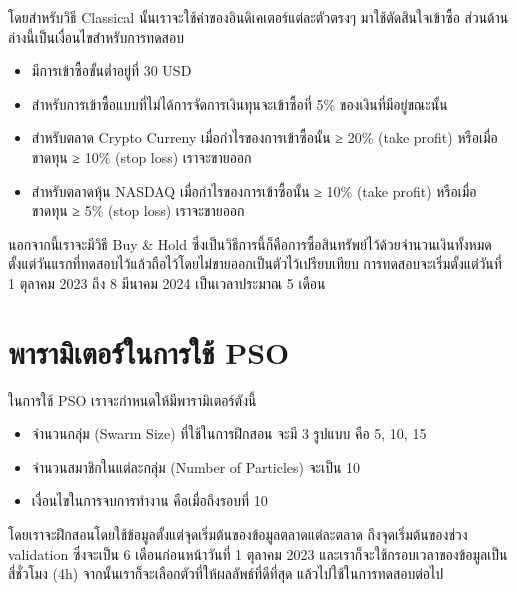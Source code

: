 โดยสำหรับวิธี Classical นั้นเราจะใช้ค่าของอินดิเคเตอร์แต่ละตัวตรงๆ มาใช้ตัดสินใจเข้าซื้อ ส่วนด้านล่างนี้เป็นเงื่อนไขสำหรับการทดสอบ

\begin{itemize}
    \item {มีการเข้าซื้อขั้นต่ำอยู่ที่ 30 USD}
    \item {สำหรับการเข้าซื้อแบบที่ไม่ได้การจัดการเงินทุนจะเข้าซื้อที่ 5\% ของเงินที่มีอยู่ขณะนั้น}
    \item {สำหรับตลาด Crypto Curreny เมื่อกำไรของการเข้าซื้อนั้น ≥ 20\% (take profit) หรือเมื่อขาดทุน ≥ 10\% (stop loss) เราจะขายออก}
    \item {สำหรับตลาดหุ้น NASDAQ เมื่อกำไรของการเข้าซื้อนั้น ≥ 10\% (take profit) หรือเมื่อขาดทุน ≥ 5\% (stop loss) เราจะขายออก}
\end{itemize}
นอกจากนี้เราจะมีวิธี Buy \& Hold ซึ่งเป็นวิธีการนี้ก็คือการซื้อสินทรัพย์ไว้ด้วยจำนวนเงินทั้งหมด ตั้งแต่วันแรกที่ทดสอบไว้แล้วถือไว้โดยไม่ขายออกเป็นตัวไว้เปรียบเทียบ การทดสอบจะเริ่มตั้งแต่วันที่ 1 ตุลาคม 2023 ถึง 8 มีนาคม 2024 เป็นเวลาประมาณ 5 เดือน

\section{พารามิเตอร์ในการใช้ PSO}
ในการใช้ PSO เราจะกำหนดให้มีพารามิเตอร์ตังนี้
\begin{itemize}
    \item {จำนวนกลุ่ม (Swarm Size) ที่ใช้ในการฝึกสอน จะมี 3 รูปแบบ คือ 5, 10, 15}
    \item {จำนวนสมาชิกในแต่ละกลุ่ม (Number of Particles) จะเป็น 10}
    \item {เงื่อนไขในการจบการทำงาน คือเมื่อถึงรอบที่ 10}
\end{itemize}
โดยเราจะฝึกสอนโดยใช้ข้อมูลตั้งแต่จุดเริ่มต้นของข้อมูลตลาดแต่ละตลาด ถึงจุดเริ่มต้นของช่วง validation ซึ่งจะเป็น 6 เดือนก่อนหน้าวันที่ 1 ตุลาคม 2023 และเราก็จะใช้กรอบเวลาของข้อมูลเป็นสี่ชั่วโมง (4h) จากนั้นเราก็จะเลือกตัวที่ให้ผลลัพธ์ที่ดีที่สุด แล้วไปใช้ในการทดสอบต่อไป

